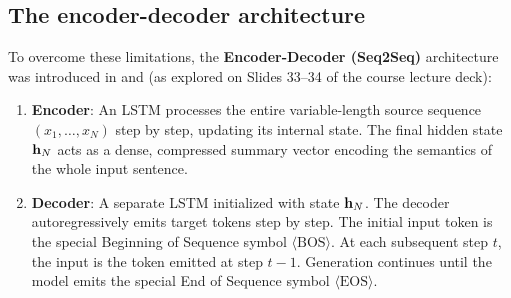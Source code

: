 \documentclass[../../main.tex]{subfiles}
\begin{document}
\subsection{The encoder-decoder architecture}
To overcome these limitations, the \textbf{Encoder-Decoder (Seq2Seq)} architecture was introduced in \cite{sutskever2014} and \cite{cho2014} (as explored on Slides 33--34 of the course lecture deck):
\begin{enumerate}
    \item \textbf{Encoder}: An LSTM processes the entire variable-length source sequence $(x_1, \dots, x_N)$ step by step, updating its internal state. The final hidden state $\mathbf{h}_N$ acts as a dense, compressed summary vector encoding the semantics of the whole input sentence.
    \item \textbf{Decoder}: A separate LSTM initialized with state $\mathbf{h}_N$. The decoder autoregressively emits target tokens step by step. The initial input token is the special Beginning of Sequence symbol $\langle\text{BOS}\rangle$. At each subsequent step $t$, the input is the token emitted at step $t-1$. Generation continues until the model emits the special End of Sequence symbol $\langle\text{EOS}\rangle$.
\end{enumerate}
\end{document}
